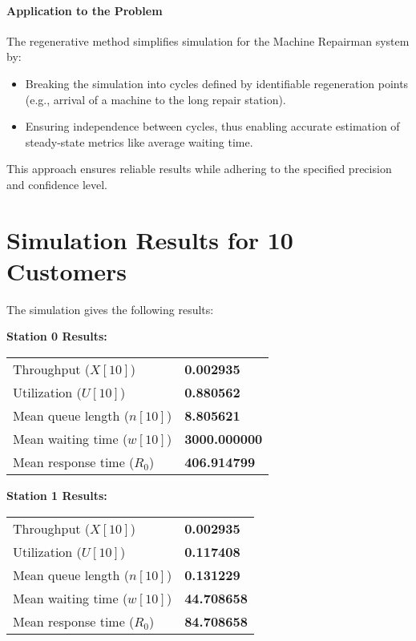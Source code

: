\documentclass[12pt]{article}
\begin{document}
	\paragraph{Application to the Problem}
	The regenerative method simplifies simulation for the Machine Repairman system by:
	\begin{itemize}
		\item Breaking the simulation into cycles defined by identifiable regeneration points (e.g., arrival of a machine to the long repair station).
		\item Ensuring independence between cycles, thus enabling accurate estimation of steady-state metrics like average waiting time.
	\end{itemize}
	
	This approach ensures reliable results while adhering to the specified precision and confidence level.
	\newpage
	\section*{Simulation Results for 10 Customers}
	The simulation gives the following results:
	
	\noindent\textbf{Station 0 Results:}
	\begin{table}[h!]
		\centering
		\begin{tabular}{@{}l l@{}}
			\toprule
			Throughput ($X[10]$)              & \textbf{0.002935} \\
			Utilization ($U[10]$)             & \textbf{0.880562} \\
			Mean queue length ($n[10]$)       & \textbf{8.805621} \\
			Mean waiting time ($w[10]$)       & \textbf{3000.000000} \\
			Mean response time ($R_0$)        & \textbf{406.914799} \\
			\bottomrule
		\end{tabular}
	\end{table}
	
	\noindent\textbf{Station 1 Results:}
	\begin{table}[h!]
		\centering
		\begin{tabular}{@{}l l@{}}
			\toprule
			Throughput ($X[10]$)              & \textbf{0.002935} \\
			Utilization ($U[10]$)             & \textbf{0.117408} \\
			Mean queue length ($n[10]$)       & \textbf{0.131229} \\
			Mean waiting time ($w[10]$)       & \textbf{44.708658} \\
			Mean response time ($R_0$)        & \textbf{84.708658} \\
			\bottomrule
		\end{tabular}
	\end{table}
	
\end{document}
